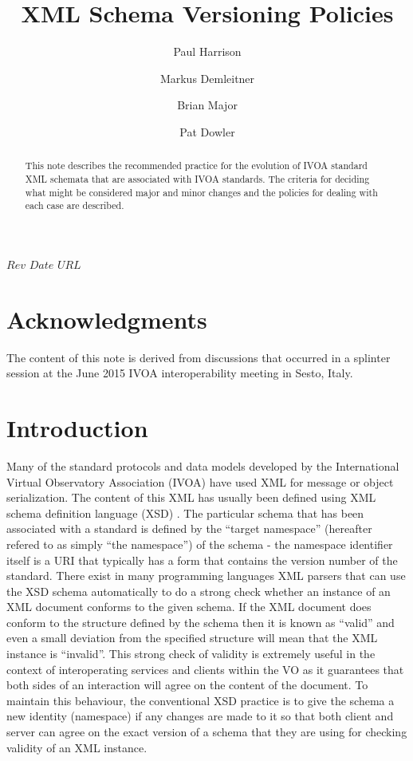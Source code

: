 \documentclass[10pt,a4paper]{ivoa}
\title{XML Schema Versioning Policies}
\author[http://www.ivoa.net/cgi-bin/twiki/bin/view/IVOA/PaulHarrison]{Paul Harrison}
\author[http://www.ivoa.net/cgi-bin/twiki/bin/view/IVOA/MarkusDemleitner]{Markus Demleitner}
\author[http://www.ivoa.net/cgi-bin/twiki/bin/view/IVOA/BrianMajor]{Brian Major}
\author[http://www.ivoa.net/cgi-bin/twiki/bin/view/IVOA/PatDowler]{Pat Dowler}
\begin{document}
\SVN$Rev$
\SVN$Date$
\SVN$URL$

\begin{abstract}
This note describes the recommended practice for the evolution of IVOA
standard XML schemata that are associated with IVOA standards.  The criteria for
deciding what might be considered major and minor changes and the policies for dealing with each case are described.
\end{abstract}



\section*{Acknowledgments}

The content of this note is derived from discussions that occurred in a splinter
session at the June 2015 IVOA interoperability meeting in Sesto, Italy.

\section{Introduction}

Many of the standard protocols and data models developed by
the International Virtual Observatory Association (IVOA) have used XML
\citet{std:XML} for message or object serialization. The content of this XML has
usually been defined using XML schema definition language (XSD) \citet{std:XSD}.
The particular schema that has been associated with a standard 
is defined by the ``target namespace'' (hereafter refered to as simply ``the
namespace'') of the schema - the namespace identifier itself is a URI that
typically has a form that contains the version number of the standard. There
exist in many programming languages XML parsers that can use the XSD schema
automatically to do a strong check whether an instance of an XML
document conforms to the given schema. If the XML document does conform to the
structure defined by the schema then it is known as ``valid'' and even a small
deviation from the specified structure will mean that the XML instance is
``invalid''. This strong check of validity is extremely useful in the context of
interoperating services and clients within the VO as it guarantees that both
sides of an interaction will agree on the content of the document. To maintain
this behaviour, the conventional XSD practice is to give the schema a new
identity (namespace) if any changes are made to it so that both client and
server can agree on the exact version of a schema that they are using for
checking validity of an XML instance.
\end{document}
